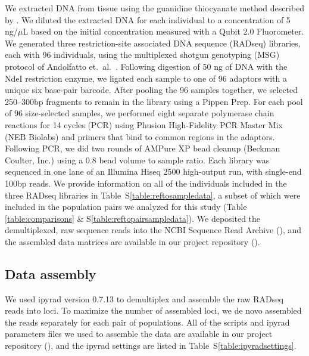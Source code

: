 We extracted DNA from tissue using the guanidine thiocyanate method described
by \citet{Esselstyn2008}.
We diluted the extracted DNA for each individual to a concentration of 5
ng/$\mu$L based on the initial concentration measured with a Qubit 2.0
Fluorometer.
We generated three restriction-site associated DNA sequence (RADseq) libraries,
each with 96 individuals, using the multiplexed shotgun genotyping (MSG)
protocol of Andolfatto et.\ al.\ \citep{Andolfatto2011}.
Following digestion of 50 ng of DNA with the NdeI restriction enzyme, we
ligated each sample to one of 96 adaptors with a unique six base-pair barcode.
After pooling the 96 samples together, we selected 250--300bp fragments to
remain in the library using a Pippen Prep.
For each pool of 96 size-selected samples, we performed eight separate
polymerase chain reactions for 14 cycles (PCR) using Phusion High-Fidelity PCR
Master Mix (NEB Biolabs) and primers that bind to common regions in the
adaptors.
Following PCR, we did two rounds of AMPure XP bead cleanup (Beckman Coulter,
Inc.) using a 0.8 bead volume to sample ratio.
Each library was sequenced in one lane of an Illumina Hiseq 2500 high-output
run, with single-end 100bp reads.
We provide information on all of the individuals included in the three RADseq
libraries in Table~S\ref{table:reftosampledata}, a subset of which were
included in the population pairs we analyzed for this study (Table
\ref{table:comparisons} \& S\ref{table:reftopairsampledata}).
We deposited the demultiplexed, raw sequence reads into the NCBI Sequence Read
Archive
(),
and the assembled data matrices are available in our project repository
().


\subsection{Data assembly}
We used ipyrad version 0.7.13 \citep{ipyrad0713} to demultiplex and assemble
the raw RADseq reads into loci.
To maximize the number of assembled loci, we de novo assembled the reads
separately for each pair of populations.
All of the scripts and ipyrad parameters files we used to assemble the data are
available in our project repository
(),
and the ipyrad settings are listed in
Table~S\ref{table:ipyradsettings}.

